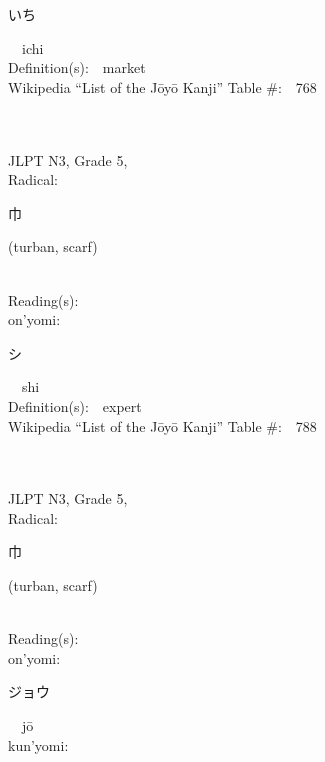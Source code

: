 \begin{multicols}{2}
{\hspace*{2em}}{\begin{CJK}{UTF8}{min} いち \end{CJK}}\ \ ichi\ \ \\
Definition(s):\ \ market \\
Wikipedia ``List of the J\=oy\=o Kanji'' Table \#:\ \ 768 \\
\ \ \\
{\fontsize{34pt}{40pt}  }\ \ \\  %
{JLPT N3, Grade 5, \\Radical:\ \ {\begin{CJK}{UTF8}{min} 巾 \end{CJK}} (turban, scarf) } \\
Reading(s):\ \ \\
{\hspace*{1em}}on'yomi:\ \ \\
{\hspace*{2em}}{\begin{CJK}{UTF8}{min} シ \end{CJK}}\ \ shi\ \ \\
Definition(s):\ \ expert \\
Wikipedia ``List of the J\=oy\=o Kanji'' Table \#:\ \ 788 \\
\ \ \\
{\fontsize{34pt}{40pt}  }\ \ \\  %
{JLPT N3, Grade 5, \\Radical:\ \ {\begin{CJK}{UTF8}{min} 巾 \end{CJK}} (turban, scarf) } \\
Reading(s):\ \ \\
{\hspace*{1em}}on'yomi:\ \ \\
{\hspace*{2em}}{\begin{CJK}{UTF8}{min} ジョウ \end{CJK}}\ \ j\=o\ \ \\
{\hspace*{1em}}kun'yomi:\ \ \\

\end{multicols}
